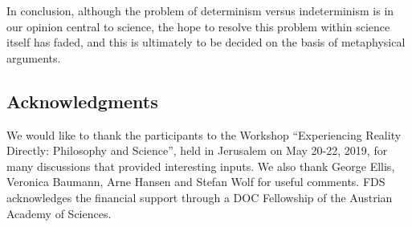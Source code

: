 \documentclass[aps,prl,twocolumn,showpacs,superscriptaddress,groupedaddress, nofootinbib]{revtex4-1}
\begin{document}
In conclusion, although the problem of determinism versus indeterminism is in our opinion central to science, the hope to resolve this problem within science itself has faded, and this is ultimately to be decided on the basis of metaphysical arguments.


\subsection{Acknowledgments}
We would like to thank the participants to the Workshop ``Experiencing  Reality Directly: Philosophy and Science'', held in Jerusalem on May 20-22, 2019, for many discussions that provided interesting inputs. We also thank George Ellis, Veronica Baumann, Arne Hansen and Stefan Wolf for useful comments. FDS acknowledges the financial support through a DOC Fellowship of the Austrian Academy of Sciences.
\end{document}
